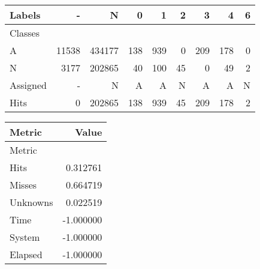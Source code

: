\begin{tabular}{l|r|r|r|r|r|r|r|r}

Labels &      - &       N &    0 &    1 &   2 &    3 &    4 &  6 \\\hline
Classes  &        &         &      &      &     &      &      &    \\\hline
\hline
A        &  11538 &  434177 &  138 &  939 &   0 &  209 &  178 &  0 \\\hline
N        &   3177 &  202865 &   40 &  100 &  45 &    0 &   49 &  2 \\\hline
\hline
Assigned &      - &       N &    A &    A &   N &    A &    A &  N \\\hline
Hits     &      0 &  202865 &  138 &  939 &  45 &  209 &  178 &  2 
\end{tabular}
\begin{tabular}{l|r}

Metric   &     Value \\\hline
Metric   &           \\\hline
\hline
Hits     &  0.312761 \\\hline
Misses   &  0.664719 \\\hline
Unknowns &  0.022519 \\\hline
Time     & -1.000000 \\\hline
System   & -1.000000 \\\hline
Elapsed  & -1.000000 
\end{tabular}
